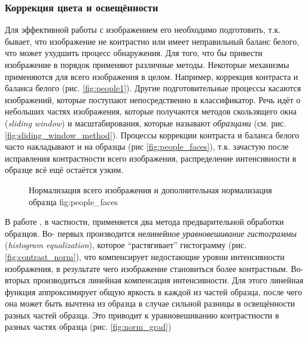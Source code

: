 \documentclass[12pt]{report}
\begin{document}
\subsubsection{Коррекция цвета и освещённости}
\label{sec:preprocessing_theor}
Для эффективной работы с изображением его необходимо подготовить, т.к. бывает, что изображение не контрастно или 
имеет неправильный баланс белого, что может ухудшить процесс обнаружения. Для того, что бы привести изображение в 
порядок применяют различные методы. Некоторые механизмы применяются для всего изображения в целом. Например, 
коррекция контраста и 
баланса белого (рис. \ref{fig:people1}). Другие подготовительные процессы касаются изображений, которые поступают 
непосредственно в классификатор. Речь идёт о небольших частях изображения, которые получаются методов скользящего 
окна (\textit{sliding window}) и масштабирования, которые называют \emph{образцами} %
 (см. рис. \ref{fig:sliding_window_method}). 
Процессы коррекции контраста и баланса белого часто накладывают и на образцы (рис \ref{fig:people_faces}), т.к. 
зачастую после исправления контрастности всего изображения, распределение интенсивности в образце всё ещё остаётся 
узким.

\begin{figure}[h]
	\centering
	\caption{Нормализация всего изображения  и дополнительная нормализация образца \subref
{fig:people_faces}}
	\label{fig:normalize_example}
\end{figure}

В работе \citep{rowley1998neural}, в частности, применяется два метода предварительной обработки образцов. Во-
первых 
производится нелинейное \emph{уравновешивание гистограммы} (\textit{histogram equalization}), которое 
``растягивает'' 
гистограмму (рис. \ref{fig:contrast_norm}), что компенсирует недостающие уровни интенсивности изображения, в 
результате чего изображение становиться 
более контрастным. Во-вторых производиться линейная компенсация интенсивности. Для этого линейная функция 
аппроксимирует общую яркость в каждой из частей образца, после чего она может быть вычтена из образца в случае 
сильной разницы в освещённости разных частей образца. Это приводит к уравновешиванию контрастности в разных частях 
образца (рис. \ref{fig:norm_grad}) 
\end{document}
